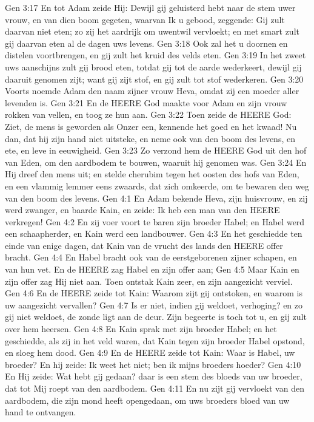 Gen 3:17  En tot Adam zeide Hij: Dewijl gij geluisterd hebt naar de stem uwer vrouw, en van dien boom gegeten, waarvan Ik u gebood, zeggende: Gij zult daarvan niet eten; zo zij het aardrijk om uwentwil vervloekt; en met smart zult gij daarvan eten al de dagen uws levens.
Gen 3:18  Ook zal het u doornen en distelen voortbrengen, en gij zult het kruid des velds eten.
Gen 3:19  In het zweet uws aanschijns zult gij brood eten, totdat gij tot de aarde wederkeert, dewijl gij daaruit genomen zijt; want gij zijt stof, en gij zult tot stof wederkeren.
Gen 3:20  Voorts noemde Adam den naam zijner vrouw Heva, omdat zij een moeder aller levenden is.
Gen 3:21  En de HEERE God maakte voor Adam en zijn vrouw rokken van vellen, en toog ze hun aan.
Gen 3:22  Toen zeide de HEERE God: Ziet, de mens is geworden als Onzer een, kennende het goed en het kwaad! Nu dan, dat hij zijn hand niet uitsteke, en neme ook van den boom des levens, en ete, en leve in eeuwigheid.
Gen 3:23  Zo verzond hem de HEERE God uit den hof van Eden, om den aardbodem te bouwen, waaruit hij genomen was.
Gen 3:24  En Hij dreef den mens uit; en stelde cherubim tegen het oosten des hofs van Eden, en een vlammig lemmer eens zwaards, dat zich omkeerde, om te bewaren den weg van den boom des levens.
Gen 4:1  En Adam bekende Heva, zijn huisvrouw, en zij werd zwanger, en baarde Kain, en zeide: Ik heb een man van den HEERE verkregen!
Gen 4:2  En zij voer voort te baren zijn broeder Habel; en Habel werd een schaapherder, en Kain werd een landbouwer.
Gen 4:3  En het geschiedde ten einde van enige dagen, dat Kain van de vrucht des lands den HEERE offer bracht.
Gen 4:4  En Habel bracht ook van de eerstgeborenen zijner schapen, en van hun vet. En de HEERE zag Habel en zijn offer aan;
Gen 4:5  Maar Kain en zijn offer zag Hij niet aan. Toen ontstak Kain zeer, en zijn aangezicht verviel.
Gen 4:6  En de HEERE zeide tot Kain: Waarom zijt gij ontstoken, en waarom is uw aangezicht vervallen?
Gen 4:7  Is er niet, indien gij weldoet, verhoging? en zo gij niet weldoet, de zonde ligt aan de deur. Zijn begeerte is toch tot u, en gij zult over hem heersen.
Gen 4:8  En Kain sprak met zijn broeder Habel; en het geschiedde, als zij in het veld waren, dat Kain tegen zijn broeder Habel opstond, en sloeg hem dood.
Gen 4:9  En de HEERE zeide tot Kain: Waar is Habel, uw broeder? En hij zeide: Ik weet het niet; ben ik mijns broeders hoeder?
Gen 4:10  En Hij zeide: Wat hebt gij gedaan? daar is een stem des bloeds van uw broeder, dat tot Mij roept van den aardbodem.
Gen 4:11  En nu zijt gij vervloekt van den aardbodem, die zijn mond heeft opengedaan, om uws broeders bloed van uw hand te ontvangen.

